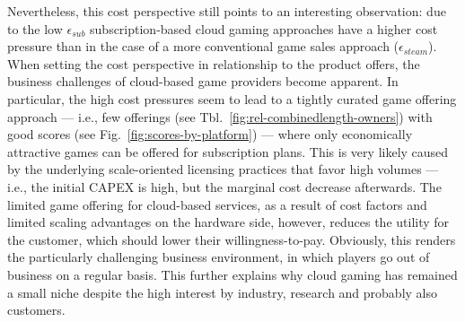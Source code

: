 Nevertheless, this cost perspective still points to an interesting observation: due to the low $\epsilon_{sub}$ subscription-based cloud gaming approaches have a higher cost pressure than in the case of a more conventional game sales approach ($\epsilon_{steam}$). When setting the cost perspective in relationship to the product offers, the business challenges of cloud-based game providers become apparent. In particular, the high cost pressures seem to lead to a tightly curated game offering approach --- i.e., few offerings (see Tbl.~\ref{fig:rel-combinedlength-owners}) with good scores (see Fig.~\ref{fig:scores-by-platform}) --- where only economically attractive games can be offered for subscription plans. This is very likely caused by the underlying scale-oriented licensing practices that favor high volumes --- i.e., the initial \gls{CAPEX} is high, but the marginal cost decrease afterwards. The limited game offering for cloud-based services, as a result of cost factors and limited scaling advantages on the hardware side, however, reduces the utility for the customer, which should lower their willingness-to-pay. Obviously, this renders the particularly challenging business environment, in which players go out of business on a regular basis. This further explains why cloud gaming has remained a small niche despite the high interest by industry, research and probably also customers.


















